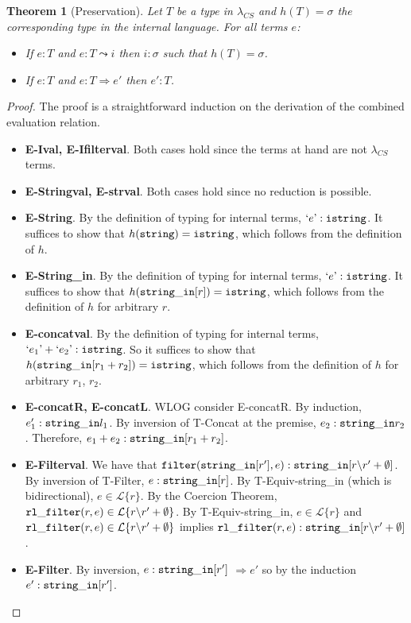 \documentclass[10pt,preprint]{sigplanconf}
\newtheorem{thm}{Theorem}
\theoremstyle{definition}
\newcommand{\Lagr}{\mathcal{L}}
\newcommand{\strin}{{\tt string\_in}}
\newcommand{\lang}[1]{\Lagr\{#1\}}
\newcommand{\str}{ {\tt string} }
\newcommand{\istr}{ {\tt istring} }
\newcommand{\filter}[2]{ {\tt filter}(#1,#2) }
\newcommand{\reduces}{ \Rightarrow }
\newcommand{\ireduces}{ \leadsto }
\newcommand{\istrf}[1]{`#1\textrm'} %
\newcommand{\lcs}{\lambda_{CS}}
\begin{document}
\begin{thm}[Preservation]
  Let $T$ be a type in $\lcs$ and $h(T)=\sigma$ the corresponding type in the internal language.
  For all terms $e$:
  \begin{itemize}
    \item If $e:T$ and $e:T \ireduces i$ then $i : \sigma$ such that $h(T) = \sigma$.
    \item If $e:T$ and $e:T \reduces e'$ then $e':T$.
  \end{itemize}
\end{thm}
\begin{proof}
The proof is a straightforward induction on the derivation of the combined evaluation relation.
\begin{itemize}[label=$ $,itemsep=1ex]
  \item \textbf{E-Ival, E-Ifilterval}. Both cases hold since the terms at hand are not $\lcs$ terms.
  \item \textbf{E-Stringval, E-strval}. Both cases hold since no reduction is possible. 
  \item \textbf{E-String}. By the definition of typing for internal terms, $\istrf{e} : \istr$. It suffices to show that $h(\str) = \istr$, which follows from the definition of $h$.
  \item \textbf{E-String\_in}. By the definition of typing for internal terms, $\istrf{e} : \istr$. It suffices to show that $h(\strin[r]) = \istr$, which follows from the definition of $h$ for arbitrary $r$.
  \item \textbf{E-concatval}. By the definition of typing for internal terms, $\istrf{e_1} + \istrf{e_2} : \istr$. So it suffices to show that $h(\strin[r_1+r_2]) = \istr$, which follows from the definition of $h$ for arbitrary $r_1$, $r_2$.
  \item \textbf{E-concatR, E-concatL}. WLOG consider E-concatR. By induction, $e_1' : \strin{l_1}$. By inversion of T-Concat at the premise, $e_2 : \strin{r_2}$. Therefore, $e_1 + e_2 : \strin[r_1 + r_2]$.
  \item \textbf{E-Filterval}. We have that $\filter{\strin[r']}{e}:\strin[r\backslash r' + \emptyset]$. By inversion of T-Filter, $e:\strin[r]$.
    By T-Equiv-string\_in (which is bidirectional), $e \in \lang{r}$.
    By the Coercion Theorem, ${\tt rl\_filter}(r,e) \in \lang{r\backslash r' + \emptyset}$.
    By T-Equiv-string\_in,  $e \in \lang{r}$ and ${\tt rl\_filter}(r,e) \in \lang{r\backslash r' + \emptyset}$ implies ${\tt rl\_filter}(r,e):\strin[r\backslash r' + \emptyset]$.
  \item \textbf{E-Filter}. By inversion, $e : \strin[r']$ $\reduces e'$ so by the induction $e':\strin[r']$.

\end{itemize}
\end{proof}
\end{document}
